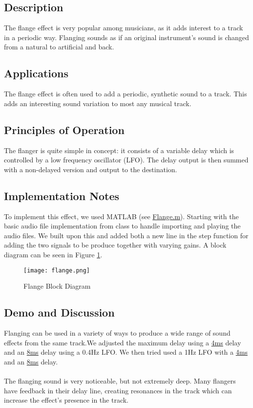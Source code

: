 \subsection{Description}
The flange effect is very popular among musicians, as it adds interest to a track in a periodic way. Flanging sounds as if an original instrument's sound is changed from a natural to artificial and back.

\subsection{Applications}
The flange effect is often used to add a periodic, synthetic sound to a track. This adds an interesting sound variation to most any musical track.

\subsection{Principles of Operation}
The flanger is quite simple in concept: it consists of a variable delay which is controlled by a low frequency oscillator (LFO). The delay output is then summed with a non-delayed version and output to the destination.

\subsection{Implementation Notes}
To implement this effect, we used MATLAB (see \href{run:../Flange.m}{Flange.m}). Starting with the basic audio file implementation from class to handle importing and playing the audio files. We built upon this and added both a new line in the step function for adding the two signals to be produce together with varying gains. A block diagram can be seen in Figure \ref{fig:flange-block-diagram}.
\begin{figure}[ht]
	\centering
	\texttt{[image: flange.png]}
	\caption{Flange Block Diagram}
	\label{fig:flange-block-diagram}
\end{figure}

\subsection{Demo and Discussion}
Flanging can be used in a variety of ways to produce a wide range of sound effects from the same track.We adjusted the maximum delay using a
\href{run:../OutputAudio/flange_22-004 Original Guitar_{freq0.4Hz}{delay_max=4ms}.wav}{4ms}
delay and an
\href{run:../OutputAudio/flange_22-004 Original Guitar_{freq=0.4Hz}{delay_max=8ms}.wav}{8ms}
 delay using a 0.4Hz LFO. We then tried used a 1Hz LFO with a
\href{run:../OutputAudio/flange_22-004 Original Guitar_{freq=1Hz}{delay_max=4ms}.wav}{4ms}
and an
\href{run:../OutputAudio/flange_22-004 Original Guitar_{freq=1Hz}{delay_max=8ms}.wav}{8ms}
delay.
\\ \\
The flanging sound is very noticeable, but not extremely deep. Many flangers have feedback in their delay line, creating resonances in the track which can increase the effect's presence in the track.

